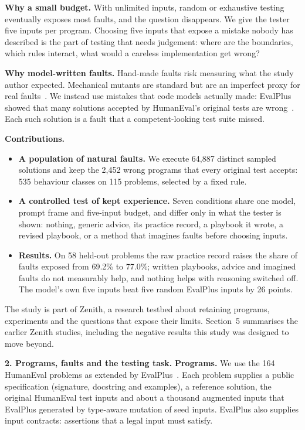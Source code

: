 \documentclass[11pt]{article}
\begin{document}
\textbf{Why a small budget.} With unlimited inputs, random or exhaustive testing
eventually exposes most faults, and the question disappears. We give the tester
five inputs per program. Choosing five inputs that expose a mistake nobody has
described is the part of testing that needs judgement: where are the boundaries,
which rules interact, what would a careless implementation get wrong?

\textbf{Why model-written faults.} Hand-made faults risk measuring what the study
author expected. Mechanical mutants are standard but are an imperfect proxy for
real faults~\cite[\S3]{mutants}. We instead use mistakes that code models actually
made: EvalPlus showed that many solutions accepted by HumanEval's original tests
are wrong~\cite[\S1; \S3]{evalplus}. Each such solution is a fault that a
competent-looking test suite missed.

\textbf{Contributions.}
\begin{itemize}
\item \textbf{A population of natural faults.} We execute 64{,}887 distinct sampled
solutions and keep the 2{,}452 wrong programs that every original test accepts:
535 behaviour classes on 115 problems, selected by a fixed rule.
\item \textbf{A controlled test of kept experience.} Seven conditions share one
model, prompt frame and five-input budget, and differ only in what the tester is
shown: nothing, generic advice, its practice record, a playbook it wrote, a revised
playbook, or a method that imagines faults before choosing inputs.
\item \textbf{Results.} On 58 held-out problems the raw practice record raises the
share of faults exposed from 69.2\% to 77.0\%; written playbooks, advice and imagined
faults do not measurably help, and nothing helps with reasoning switched off. The
model's own five inputs beat five random EvalPlus inputs by 26 points.
\end{itemize}

The study is part of Zenith, a research testbed about retaining programs,
experiments and the questions that expose their limits. Section~5 summarises the
earlier Zenith studies, including the negative results this study was designed
to move beyond.

\hypertarget{setting}{}
\textbf{2. Programs, faults and the testing task.}
\textbf{Programs.} We use the 164 HumanEval problems as extended by
EvalPlus~\cite[\S2]{evalplus}. Each problem supplies a public specification
(signature, docstring and examples), a reference solution, the original
HumanEval test inputs and about a thousand augmented inputs that EvalPlus
generated by type-aware mutation of seed inputs. EvalPlus also supplies input
contracts: assertions that a legal input must satisfy.
\end{document}
